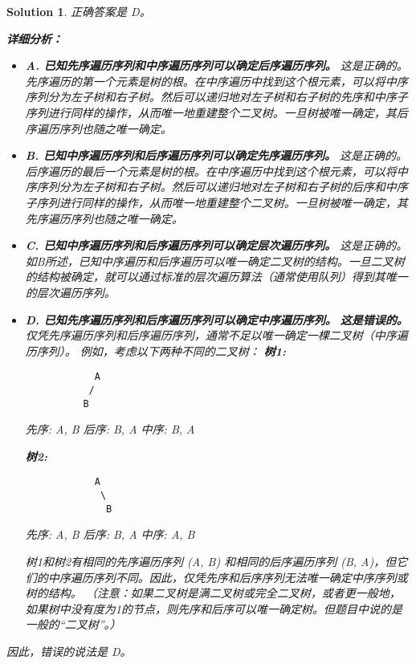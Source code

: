 \documentclass[UTF8]{report}
\newtheorem{solution}{Solution}
\theoremstyle{MyLineTheoremStyle} %
\theoremstyle{MyBlockTheoremStyle} %
\theoremstyle{MySubsubsectionStyle} %
\begin{document}
\begin{solution}
正确答案是 D。

\textbf{详细分析：}

\begin{itemize}
    \item \textbf{A. 已知先序遍历序列和中序遍历序列可以确定后序遍历序列。}
        这是正确的。先序遍历的第一个元素是树的根。在中序遍历中找到这个根元素，可以将中序序列分为左子树和右子树。然后可以递归地对左子树和右子树的先序和中序子序列进行同样的操作，从而唯一地重建整个二叉树。一旦树被唯一确定，其后序遍历序列也随之唯一确定。

    \item \textbf{B. 已知中序遍历序列和后序遍历序列可以确定先序遍历序列。}
        这是正确的。后序遍历的最后一个元素是树的根。在中序遍历中找到这个根元素，可以将中序序列分为左子树和右子树。然后可以递归地对左子树和右子树的后序和中序子序列进行同样的操作，从而唯一地重建整个二叉树。一旦树被唯一确定，其先序遍历序列也随之唯一确定。

    \item \textbf{C. 已知中序遍历序列和后序遍历序列可以确定层次遍历序列。}
        这是正确的。如B所述，已知中序遍历和后序遍历可以唯一确定二叉树的结构。一旦二叉树的结构被确定，就可以通过标准的层次遍历算法（通常使用队列）得到其唯一的层次遍历序列。

    \item \textbf{D. 已知先序遍历序列和后序遍历序列可以确定中序遍历序列。}
        \textbf{这是错误的。} 仅凭先序遍历序列和后序遍历序列，通常不足以唯一确定一棵二叉树（中序遍历序列）。
        例如，考虑以下两种不同的二叉树：
        \textbf{树1:}
        \begin{verbatim}
            A
           /
          B
        \end{verbatim}
        先序: A, B
        后序: B, A
        中序: B, A

        \textbf{树2:}
        \begin{verbatim}
            A
             \
              B
        \end{verbatim}
        先序: A, B
        后序: B, A
        中序: A, B

        树1和树2有相同的先序遍历序列 (A, B) 和相同的后序遍历序列 (B, A)，但它们的中序遍历序列不同。因此，仅凭先序和后序序列无法唯一确定中序序列或树的结构。
        （注意：如果二叉树是满二叉树或完全二叉树，或者更一般地，如果树中没有度为1的节点，则先序和后序可以唯一确定树。但题目中说的是一般的“二叉树”。）
\end{itemize}

因此，错误的说法是 D。
\end{solution}
\end{document}
